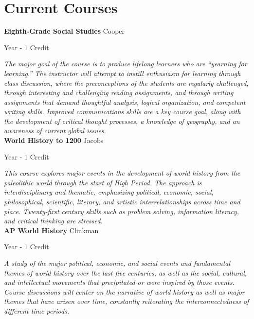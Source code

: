 \section{Current Courses}

\noindent\textbf{Eighth-Grade Social Studies} \hfill Cooper

\noindent Year - 1 Credit

\vspace{1mm}\emph{The major goal of the course is to produce lifelong learners who are “yearning for learning.”  The instructor will attempt to instill enthusiasm for learning through class discussion, where the preconceptions of the students are regularly challenged, through interesting and challenging reading assignments, and through writing assignments that demand thoughtful analysis, logical organization, and competent writing skills.  Improved communications skills are a key course goal, along with the development of critical thought processes, a knowledge of geography, and an awareness of current global issues.}\\


\noindent\textbf{World History to 1200} \hfill Jacobs

\noindent Year - 1 Credit

\vspace{1mm}\emph{This course explores major events in the development of world history from the paleolithic world through the start of High Period. The approach is interdisciplinary and thematic, emphasizing political, economic, social, philosophical, scientific, literary, and artistic interrelationships across time and place. Twenty-first century skills such as problem solving, information literacy, and critical thinking are stressed.}\\


\noindent\textbf{AP World History} \hfill Clinkman

\noindent Year - 1 Credit

\vspace{1mm}\emph{A study of the major political, economic, and social events and fundamental themes of world history over the last five centuries, as well as the social, cultural, and intellectual movements that precipitated or were inspired by those events. Course discussions will center on the narrative of world history as well as major themes that have arisen over time, constantly reiterating the interconnectedness of different time periods.}\\


